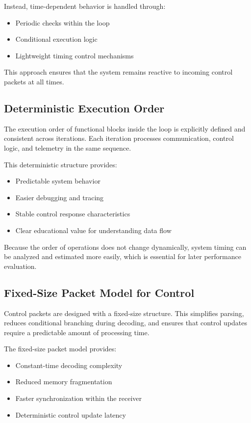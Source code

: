 Instead, time-dependent behavior is handled through:

\begin{itemize}
	\item Periodic checks within the loop
	\item Conditional execution logic
	\item Lightweight timing control mechanisms
\end{itemize}

This approach ensures that the system remains reactive to incoming control packets at all times.

\subsection{Deterministic Execution Order}

The execution order of functional blocks inside the loop is explicitly defined and consistent across iterations. Each iteration processes communication, control logic, and telemetry in the same sequence.

This deterministic structure provides:

\begin{itemize}
	\item Predictable system behavior
	\item Easier debugging and tracing
	\item Stable control response characteristics
	\item Clear educational value for understanding data flow
\end{itemize}

Because the order of operations does not change dynamically, system timing can be analyzed and estimated more easily, which is essential for later performance evaluation.

\subsection{Fixed-Size Packet Model for Control}

Control packets are designed with a fixed-size structure. This simplifies parsing, reduces conditional branching during decoding, and ensures that control updates require a predictable amount of processing time.

The fixed-size packet model provides:

\begin{itemize}
	\item Constant-time decoding complexity
	\item Reduced memory fragmentation
	\item Faster synchronization within the receiver
	\item Deterministic control update latency
\end{itemize}

